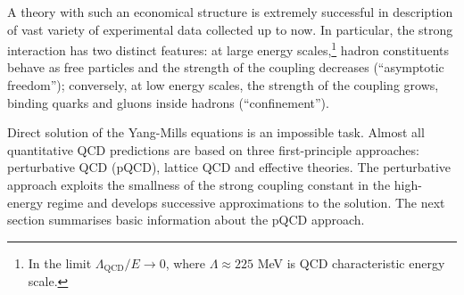 A theory with such an economical structure is extremely successful in description of vast variety of experimental data collected up to now. In particular, the strong interaction has two distinct features: at large energy scales,\footnote{In the limit $\Lambda_\mathrm{QCD}/E\rightarrow 0$, where $\Lambda\approx 225$ MeV is QCD characteristic energy scale.} hadron constituents behave as free particles and the strength of the coupling decreases (``asymptotic freedom''); conversely, at low energy scales, the strength of the coupling grows, binding quarks and gluons inside hadrons (``confinement'').  
 
Direct solution of the Yang-Mills equations is an impossible task. Almost all quantitative QCD predictions are based on three first-principle approaches: perturbative QCD (pQCD), lattice QCD and effective theories. The perturbative approach exploits the smallness of the strong coupling constant in the high-energy regime and develops successive approximations to the solution. The next section summarises basic information about the pQCD approach.

